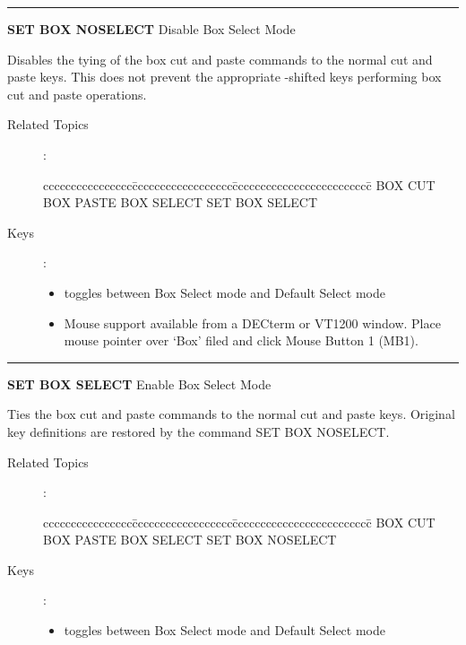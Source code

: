 \goodbreak

\rule{\textwidth}{0.3mm}

{\Large {\bf SET BOX NOSELECT} \hfill Disable Box Select Mode}

\medskip
  Disables the tying of the box cut and paste commands to the normal
  cut and paste keys. This does not prevent the appropriate \gold -shifted
  keys performing box cut and paste operations.

\begin{description}
\item[Related Topics]:
\begin{tabbing}
cccccccccccccccc\=cccccccccccccccccc\=ccccccccccccccccccccccccc\=\kill
BOX CUT   \> BOX PASTE   \> BOX SELECT \> SET BOX SELECT \\
\end{tabbing}

\item[Keys]:
          \begin{itemize}
          \item {} toggles between Box Select mode and Default
                Select mode
          \item Mouse support available from a DECterm or VT1200 window.
                Place mouse pointer over `Box' filed and click Mouse
                Button 1 (MB1).
          \end{itemize}

\end{description}

\rule{\textwidth}{0.3mm}

{\Large {\bf SET BOX SELECT} \hfill Enable Box Select Mode}

\medskip
  Ties the box cut and paste commands to the normal cut and paste keys.
  Original key definitions are restored by the command SET BOX NOSELECT.

\begin{description}
\item[Related Topics]:
\begin{tabbing}
cccccccccccccccc\=cccccccccccccccccc\=ccccccccccccccccccccccccc\=\kill
BOX CUT   \> BOX PASTE  \> BOX SELECT \> SET BOX NOSELECT \\
\end{tabbing}

\item[Keys]:
          \begin{itemize}
          \item {} toggles between Box Select mode and Default
                Select mode
          \end{itemize}

\end{description}

